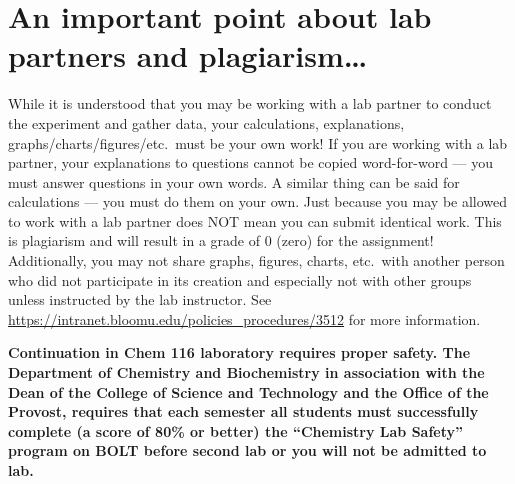 \documentclass[10pt,letterpaper]{article}
\begin{document}
\section*{An important point about lab partners and plagiarism\ldots}
While it is understood that you may be working with a lab partner to conduct the
experiment and gather data, your calculations, explanations,
graphs/charts/figures/etc.\ must be your own work!  If you are working with a lab
partner, your explanations to questions cannot be copied word-for-word --- you
must answer questions in your own words.  A similar thing can be said for
calculations --- you must do them on your own.  Just because you may be allowed to
work with a lab partner does NOT mean you can submit identical work.  This is
plagiarism and will result in a grade of 0 (zero) for the assignment!
Additionally, you may not share graphs, figures, charts, etc.\ with another
person who did not participate in its creation and especially not with other
groups unless instructed by the lab instructor. See
\url{https://intranet.bloomu.edu/policies_procedures/3512} for more information. 

\vfill

\begin{framed}
	\bfseries\noindent
	Continuation in Chem 116 laboratory requires proper safety.  The
	Department of Chemistry and Biochemistry in association with the Dean
	of the College of Science and Technology and the Office of the Provost,
	requires that each semester all students must successfully complete (a
	score of 80\% or better) the ``Chemistry Lab Safety'' program on BOLT
	before second lab or you will not be admitted to lab.
\end{framed}
\end{document}
